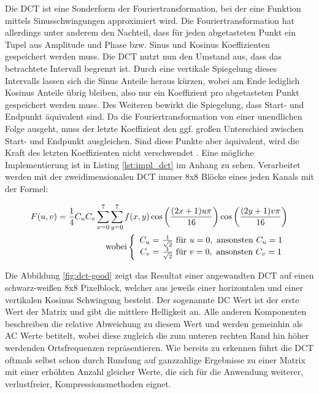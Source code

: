 Die DCT ist eine Sonderform der Fouriertransformation, bei der eine Funktion mittels Sinusschwingungen approximiert wird. Die Fouriertransformation hat allerdings unter anderem den Nachteil, dass für jeden abgetasteten Punkt ein Tupel aus Amplitude und Phase bzw. Sinus und Kosinus Koeffizienten gespeichert werden muss. Die DCT nutzt nun den Umstand aus, dass das betrachtete Intervall begrenzt ist. Durch eine vertikale Spiegelung dieses Intervalls lassen sich die Sinus Anteile heraus kürzen, wobei am Ende lediglich Kosinus Anteile übrig bleiben, also nur ein Koeffizient pro abgetasteten Punkt gespeichert werden muss. Des Weiteren bewirkt die Spiegelung, dass Start- und Endpunkt äquivalent sind. Da die Fouriertransformation von einer unendlichen Folge ausgeht, muss der letzte Koeffizient den ggf. großen Unterschied zwischen Start- und Endpunkt ausgleichen. Sind diese Punkte aber äquivalent, wird die Kraft des letzten Koeffizienten nicht verschwendet \cite{symes_peter_digital_2004}. Eine mögliche Implementierung ist in Listing \ref{lst:impl_dct} im Anhang zu sehen. Verarbeitet werden mit der zweidimensionalen DCT immer 8x8 Blöcke eines jeden Kanals mit der Formel:

\thickmuskip
\begin{align*}
  F(u,v) = \frac{1}{4} C_uC_v\sum_{x=0}^7 \sum_{y=0}^7 f(x,y) \cos \left(\frac{(2x+1)u\pi}{16}\right) \cos\left(\frac{(2y+1)v\pi}{16}\right) \\
  \text{wobei} \left\lbrace
  \begin{array}{r@{}l}
	C_u = & \text{ } \frac{1}{\sqrt{2}} \text{ für } u=0, \text{ ansonsten } C_u=1\\
	C_v = & \text{ } \frac{1}{\sqrt{2}} \text{ für } v=0, \text{ ansonsten } C_v=1
  \end{array}
  \right.
\end{align*}

Die Abbildung \ref{fig:dct-good} zeigt das Resultat einer angewandten DCT auf einen schwarz-weißen 8x8 Pixelblock, welcher aus jeweils einer horizontalen und einer vertikalen Kosinus Schwingung besteht. Der sogenannte DC Wert ist der erste Wert der Matrix und gibt die mittlere Helligkeit an. Alle anderen Komponenten beschreiben die relative Abweichung zu diesem Wert und werden gemeinhin als AC Werte betitelt, wobei diese zugleich die zum unteren rechten Rand hin höher werdenden Ortsfrequenzen repräsentieren. Wie bereits zu erkennen führt die DCT oftmals selbst schon durch Rundung auf ganzzahlige Ergebnisse zu einer Matrix mit einer erhöhten Anzahl gleicher Werte, die sich für die Anwendung weiterer, verlustfreier, Kompressionsmethoden eignet.

